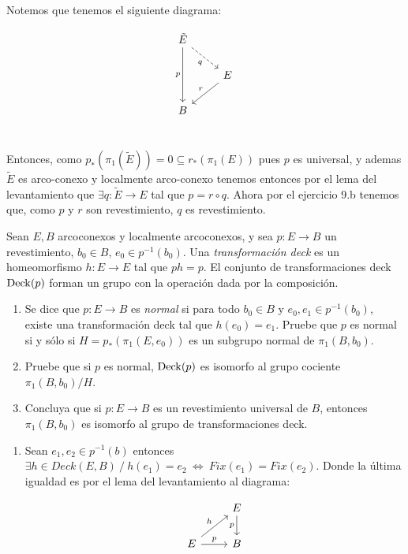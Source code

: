 \documentclass[11pt]{article}
\newenvironment{proof}[1][Demostraci\'on]{\begin{trivlist}
\item[\hskip \labelsep {\bfseries #1}]}{\end{trivlist}}
\newcommand{\qed}{\nobreak \ifvmode \relax \else
      \ifdim\lastskip<1.5em \hskip-\lastskip
      \hskip1.5em plus0em minus0.5em \fi \nobreak
      \vrule height0.75em width0.5em depth0.25em\fi}
\def \be{\begin{enumerate}}
\def \en{\end{enumerate}}
\def\deck{{\rm Deck}}
\begin{document}
\begin{enumerate}
\begin{proof}

Notemos que tenemos el siguiente diagrama:

\[
\begin{tikzcd}
\tilde{E} \arrow[swap]{dd}{p} \arrow[swap,dashed]{dr}{q} & \\
& E \arrow[swap]{dl}{r} \\
B & \\
\end{tikzcd}
\]

Entonces, como $p_*(\pi_1(\tilde{E}))=0 \subseteq r_*(\pi_1(E))$ pues $p$ es universal, y ademas $\tilde{E}$ es arco-conexo y localmente arco-conexo tenemos entonces por el lema del levantamiento que $\exists q:\tilde{E} \rightarrow E$ tal que $p = r \circ q$. Ahora por el ejercicio 9.b tenemos que, como $p$ y $r$ son revestimiento, $q$ es revestimiento. \qed

\end{proof}

\item{
Sean $E,B$ arcoconexos y localmente arcoconexos, y sea $p:E\to B$ un revestimiento, $b_0\in B$, $e_0\in p^{-1}(b_0)$. Una {\em transformaci\'on deck} es un homeomorfismo $h:E\to E$ tal que $ph=p$. El conjunto de transformaciones deck $\deck(p)$ forman un grupo con la operaci\'on dada por la composici\'on.
\be	
\item {Se dice que $p:E\to B$ es \emph{normal} si para todo $b_0\in B$ y $e_0,e_1\in p^{-1}(b_0)$, existe una transformaci\'on deck tal que $h(e_0)=e_1$. Pruebe que $p$ es normal si y s\'olo si $H=p_*(\pi_1(E,e_0))$ es un subgrupo normal de $\pi_1(B,b_0)$. }
		\item  {Pruebe que si $p$ es normal, $\deck(p)$ es isomorfo al grupo cociente $\pi_1(B,b_0)/H$.}
		\item {Concluya que si $p:E\to B$ es un revestimiento universal de $B$, entonces $\pi_1(B,b_0)$ es isomorfo al grupo de transformaciones deck.}
		\en
}

\begin{proof}

\begin{enumerate}

\item Sean $e_1,e_2 \in p^{-1}(b)$ entonces $\exists h \in \textit{Deck}(E,B) \ / \ h(e_1)=e_2 \ \Longleftrightarrow \ Fix(e_1) = Fix(e_2)$. Donde la \'ultima igualdad es por el lema del levantamiento al diagrama:

\[
\begin{tikzcd}
& E \arrow[swap]{d}{p} \\
E \arrow{ur}{h} \arrow{r}{p} & B \\
\end{tikzcd}
\]


\end{enumerate}
\end{proof}
\end{enumerate}
\end{document}

